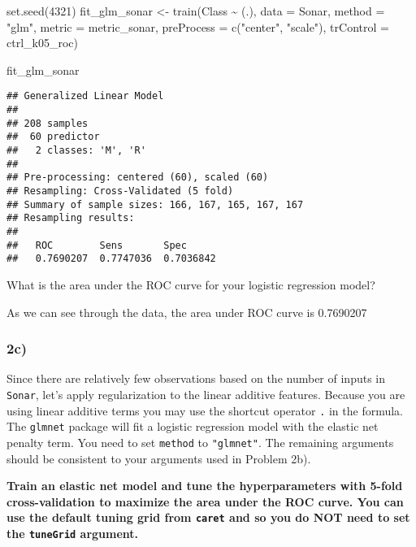 \documentclass[
]{article}
\newenvironment{Shaded}{\begin{snugshade}}{\end{snugshade}}
\newcommand{\AttributeTok}[1]{\textcolor[rgb]{0.77,0.63,0.00}{#1}}
\newcommand{\DecValTok}[1]{\textcolor[rgb]{0.00,0.00,0.81}{#1}}
\newcommand{\FunctionTok}[1]{\textcolor[rgb]{0.00,0.00,0.00}{#1}}
\newcommand{\NormalTok}[1]{#1}
\newcommand{\OtherTok}[1]{\textcolor[rgb]{0.56,0.35,0.01}{#1}}
\newcommand{\SpecialCharTok}[1]{\textcolor[rgb]{0.00,0.00,0.00}{#1}}
\newcommand{\StringTok}[1]{\textcolor[rgb]{0.31,0.60,0.02}{#1}}
\begin{document}
\begin{Shaded}
\begin{Highlighting}[]
\FunctionTok{set.seed}\NormalTok{(}\DecValTok{4321}\NormalTok{)}
\NormalTok{fit\_glm\_sonar }\OtherTok{\textless{}{-}} \FunctionTok{train}\NormalTok{(Class }\SpecialCharTok{\textasciitilde{}}\NormalTok{ (.),}
                       \AttributeTok{data =}\NormalTok{ Sonar,}
                       \AttributeTok{method =} \StringTok{"glm"}\NormalTok{,}
                       \AttributeTok{metric =}\NormalTok{ metric\_sonar,}
                       \AttributeTok{preProcess =} \FunctionTok{c}\NormalTok{(}\StringTok{"center"}\NormalTok{, }\StringTok{"scale"}\NormalTok{),}
                       \AttributeTok{trControl =}\NormalTok{ ctrl\_k05\_roc)}

\NormalTok{fit\_glm\_sonar}
\end{Highlighting}
\end{Shaded}

\begin{verbatim}
## Generalized Linear Model 
## 
## 208 samples
##  60 predictor
##   2 classes: 'M', 'R' 
## 
## Pre-processing: centered (60), scaled (60) 
## Resampling: Cross-Validated (5 fold) 
## Summary of sample sizes: 166, 167, 165, 167, 167 
## Resampling results:
## 
##   ROC        Sens       Spec     
##   0.7690207  0.7747036  0.7036842
\end{verbatim}

What is the area under the ROC curve for your logistic regression model?

As we can see through the data, the area under ROC curve is 0.7690207

\hypertarget{c-1}{%
\subsubsection{2c)}\label{c-1}}

Since there are relatively few observations based on the number of
inputs in \texttt{Sonar}, let's apply regularization to the linear
additive features. Because you are using linear additive terms you may
use the shortcut operator \texttt{.} in the formula. The \texttt{glmnet}
package will fit a logistic regression model with the elastic net
penalty term. You need to set \texttt{method} to \texttt{"glmnet"}. The
remaining arguments should be consistent to your arguments used in
Problem 2b).

\textbf{Train an elastic net model and tune the hyperparameters with
5-fold cross-validation to maximize the area under the ROC curve. You
can use the default tuning grid from \texttt{caret} and so you do NOT
need to set the \texttt{tuneGrid} argument.}
\end{document}

